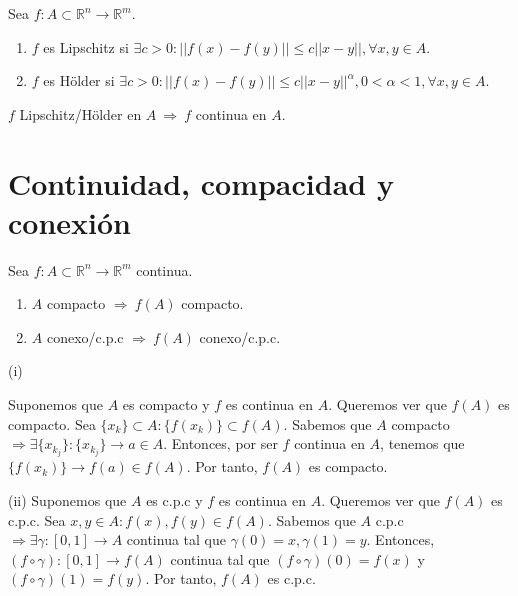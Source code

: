 \begin{defn}
Sea $f:A\subset \mathbb{R}^n \rightarrow \mathbb{R}^m$.
\begin{enumerate}[label=(\roman*)]
    \item $f$ es Lipschitz si $\exists c>0: ||f(x)-f(y)|| \leq c||x-y||, \forall x,y \in A$. 
    \item $f$ es Hölder si $\exists c>0: ||f(x)-f(y)|| \leq c||x-y||^{\alpha}, 0<\alpha<1,  \forall x,y \in A$.
\end{enumerate}
\end{defn}

\begin{obs}
$f$ Lipschitz/Hölder en $A \ \Rightarrow \ f$ continua en $A$.
\end{obs}

\section{Continuidad, compacidad y conexión}

\begin{prop}
Sea $f:A\subset \mathbb{R}^n \rightarrow \mathbb{R}^m$ continua.
\begin{enumerate}[label=(\roman*)]
    \item $A$ compacto  $\Rightarrow \ f(A)$ compacto. 
    \item $A$ conexo/c.p.c  $\Rightarrow \ f(A)$ conexo/c.p.c.
\end{enumerate}
\end{prop}

\begin{dem}(i)
    \item Suponemos que $A$ es compacto y $f$ es continua en $A$. Queremos ver que $f(A)$ es compacto. Sea $\{x_k\}\subset A : \{f(x_k)\}\subset f(A)$. Sabemos que $A$ compacto $\Rightarrow \exists \{x_{k_j}\} :\{x_{k_j}\}\rightarrow a\in A$. Entonces, por ser $f$ continua en $A$, tenemos que $\{f(x_k)\}\rightarrow f(a) \in f(A)$. Por tanto, $f(A)$ es compacto.
\end{dem}
\begin{dem}(ii)
    Suponemos que $A$ es c.p.c y $f$ es continua en $A$. Queremos ver que $f(A)$ es c.p.c. Sea $x,y\in A: f(x),f(y)\in f(A)$. Sabemos que $A$ c.p.c $\Rightarrow \exists \gamma: [0,1]\rightarrow A$ continua tal que $\gamma(0) = x, \gamma(1) = y$. Entonces, $(f\circ \gamma): [0,1] \rightarrow f(A)$ continua tal que $(f\circ \gamma)(0) = f(x)$ y $(f\circ \gamma)(1) = f(y)$. Por tanto, $f(A)$ es c.p.c.
\end{dem}

